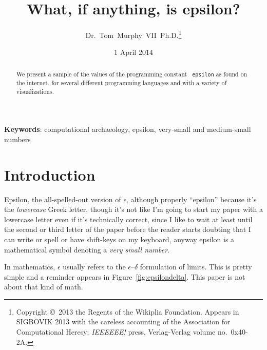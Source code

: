 \documentclass[twocolumn]{article}
\begin{document}
 

\title{What, if anything, is epsilon?}
\author{Dr.~Tom~Murphy~VII~Ph.D.\thanks{
Copyright \copyright\ 2013 the Regents of the Wikiplia
Foundation. Appears in SIGBOVIK 2013 with the careless accounting of the
Association for Computational Heresy; {\em IEEEEEE!} press,
Verlag-Verlag volume no.~0x40-2A.
}
}


\renewcommand\>{$>$}
\newcommand\<{$<$}

\newcommand\CC{{C\nolinebreak[4]\hspace{-.05em}\raisebox{.4ex}{\tiny\bf ++}}}

\date{1 April 2014}

\maketitle

\begin{abstract}
We present a sample of the values of the programming constant {\tt
  epsilon} as found on the internet, for several different programming
languages and with a variety of visualizations.
\end{abstract}

\vspace{1em}
{\noindent \small {\bf Keywords}:
 computational archaeology, epsilon, very-small and medium-small numbers
}

\section*{Introduction}

Epsilon, the all-spelled-out version of $\epsilon$, although properly
``epsilon'' because it's the {\em lowercase} Greek letter, though it's
not like I'm going to start my paper with a lowercase letter even if
it's technically correct, since I like to wait at least until the
second or third letter of the paper before the reader starts doubting
that I can write or spell or have shift-keys on my keyboard, anyway
epsilon is a mathematical symbol denoting a {\em very small number}.


In mathematics, $\epsilon$ usually refers to the
$\epsilon$--$\delta$ formulation of limits. This is pretty simple and a
reminder appears in Figure~\ref{fig:epsilondelta}. This paper is not
about that kind of math.
\end{document}
